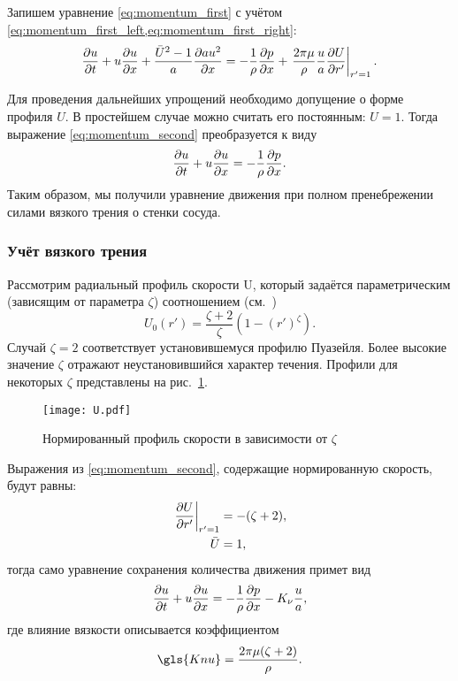 Запишем уравнение \cref{eq:momentum_first} с учётом \cref{eq:momentum_first_left,eq:momentum_first_right}:
\begin{equation}
\label{eq:momentum_second}
\frac{\partial u}{\partial t} + u\frac{\partial u}{\partial x} + \frac{\bar U^2 - 1}{a}\frac{\partial a u^2}{\partial x} =
	-\frac{1}{\rho} \frac{\partial p}{\partial x} + \left.\frac{2\pi\mu}{\rho}\frac{u}{a}\frac{\partial U}{\partial r'}\right|_{r'=1}.
\end{equation}

Для проведения дальнейших упрощений необходимо допущение о форме профиля $U$.
В простейшем случае можно считать его постоянным: $U=1$. Тогда
выражение \cref{eq:momentum_second} преобразуется к виду
\begin{equation}
\label{eq:momentum_conservation_inviscid}
\frac{\partial u}{\partial t} + u\frac{\partial u}{\partial x} = -\frac{1}{\rho} \frac{\partial p}{\partial x}.
\end{equation}
Таким образом, мы получили уравнение движения при полном пренебрежении
силами вязкого трения о стенки сосуда.

\subsubsection{Учёт вязкого трения}
Рассмотрим радиальный профиль скорости \gls{U}, который задаётся параметрическим (зависящим от параметра $\zeta$) соотношением (см.~\cite{Hughes1973,Smith2001})
\begin{equation}
U_0(r') = \frac{\zeta+2}{\zeta} \left(1 - \left(r'\right)^{\zeta}\right).
\end{equation}
Случай $\zeta=2$ соответствует установившемуся профилю Пуазейля.
Более высокие значение $\zeta$ отражают неустановившийся характер течения.
Профили для некоторых $\zeta$ представлены на рис.~\ref{fig:U}.


\begin{figure}[h]
    \centering
    \texttt{[image: U.pdf]}
    \caption{Нормированный профиль скорости в зависимости от $\zeta$}
    \label{fig:U}
\end{figure}

Выражения из \cref{eq:momentum_second}, содержащие нормированную скорость, будут равны:
\begin{align*}
\left.\frac{\partial U}{\partial r'}\right|_{r'=1} &= - (\zeta+2),\\
\bar U &= 1,
\end{align*}
тогда само уравнение сохранения количества движения примет вид
\begin{equation}
\label{eq:momentum_conservation_viscous}
\frac{\partial u}{\partial t} + u\frac{\partial u}{\partial x} =
	-\frac{1}{\rho} \frac{\partial p}{\partial x} - K_{\nu}\frac{u}{a},
\end{equation}
где влияние вязкости описывается коэффициентом
\begin{equation}
\nonumber
\gls{Knu} = \frac{2\pi\mu(\zeta+2)}{\rho}.
\end{equation}


